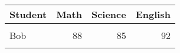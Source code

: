 \documentclass{article}
\begin{document}
\thispagestyle{empty}

\begin{table}
\centering
\begin{tabular}{lrrr}
\toprule
\textbf{Student} & \textbf{Math} & \textbf{Science} & \textbf{English}\\
\midrule
\cellcolor{green!10}{Alice} & \cellcolor{green!10}{95} & \cellcolor{green!10}{90} & \cellcolor{green!10}{88}\\
Bob & 88 & 85 & 92\\
\cellcolor{green!10}{Charlie} & \cellcolor{green!10}{92} & \cellcolor{green!10}{93} & \cellcolor{green!10}{86}\\
\bottomrule
\end{tabular}
\end{table}
\end{document}
